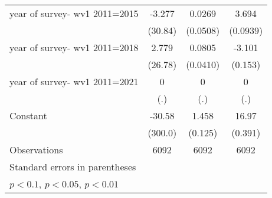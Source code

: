 {\begin{tabular}{l*{3}{c}}
\addlinespace
year of survey- wv1 2011=2015&   -3.277         &   0.0269         &    3.694\sym{***}\\
                &  (30.84)         & (0.0508)         & (0.0939)         \\
\addlinespace
year of survey- wv1 2011=2018&    2.779         &   0.0805\sym{**} &   -3.101\sym{***}\\
                &  (26.78)         & (0.0410)         &  (0.153)         \\
\addlinespace
year of survey- wv1 2011=2021&        0         &        0         &        0         \\
                &      (.)         &      (.)         &      (.)         \\
\addlinespace
Constant        &   -30.58         &    1.458\sym{***}&    16.97\sym{***}\\
                &  (300.0)         &  (0.125)         &  (0.391)         \\
\midrule
Observations    &     6092         &     6092         &     6092         \\
\bottomrule
\multicolumn{4}{l}{\footnotesize Standard errors in parentheses}\\
\multicolumn{4}{l}{\footnotesize \sym{*} \(p<0.1\), \sym{**} \(p<0.05\), \sym{***} \(p<0.01\)}\\
\end{tabular}
}
